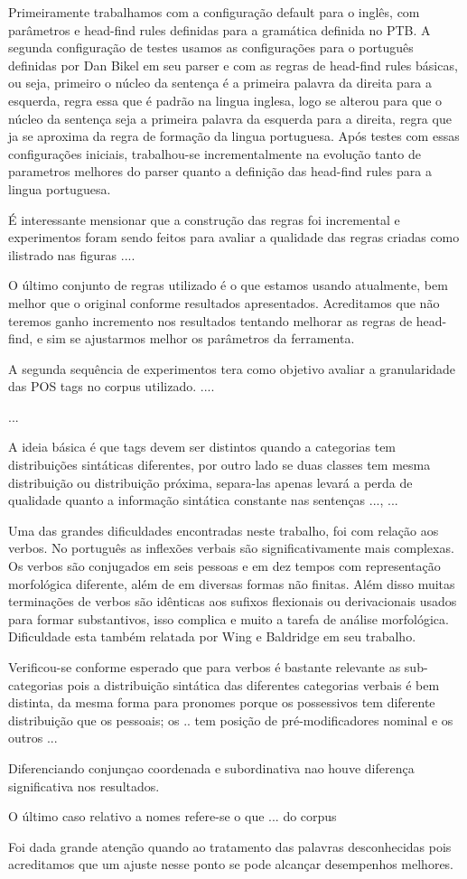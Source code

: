 Primeiramente trabalhamos com a configuração default para o inglês, com parâmetros e head-find rules definidas para a gramática definida no PTB. A segunda configuração de testes usamos as configurações para o português definidas por Dan Bikel em seu parser e com as regras de head-find rules básicas, ou seja, primeiro o núcleo da sentença é a primeira palavra da direita para a esquerda, regra essa que é padrão na lingua inglesa, logo se alterou para que o núcleo da sentença seja a primeira palavra da esquerda para a direita, regra que ja se aproxima da regra de formação da lingua portuguesa. Após testes com essas configurações iniciais, trabalhou-se incrementalmente na evolução tanto de parametros melhores do parser quanto a definição das head-find rules para a lingua portuguesa.

É interessante mensionar que a construção das regras foi incremental e experimentos foram sendo feitos para avaliar a qualidade das regras criadas como ilistrado nas figuras ....

O último conjunto de regras utilizado é o que estamos usando atualmente, bem melhor que o original conforme resultados apresentados. Acreditamos que não teremos ganho incremento nos resultados tentando melhorar as regras de head-find, e sim se ajustarmos melhor os parâmetros da ferramenta.

A segunda sequência de experimentos tera como objetivo avaliar a granularidade das POS tags no corpus utilizado. ....

...


A ideia básica é que tags devem ser distintos quando a categorias tem distribuições sintáticas diferentes, por outro lado se duas classes tem mesma distribuição ou distribuição próxima, separa-las apenas levará a perda de qualidade quanto a informação sintática constante nas sentenças ...,  ...

Uma das grandes dificuldades encontradas neste trabalho, foi com relação aos verbos. No português as inflexões verbais são significativamente mais complexas. Os verbos são conjugados em seis pessoas e em dez tempos com representação morfológica diferente, além de em diversas formas não finitas. Além disso muitas terminações de verbos são idênticas aos sufixos flexionais ou derivacionais usados para formar substantivos, isso complica e muito a tarefa de análise morfológica. Dificuldade esta também relatada por Wing e Baldridge em seu trabalho.

Verificou-se conforme esperado que para verbos é bastante relevante as sub-categorias pois a distribuição sintática das diferentes categorias verbais é bem distinta, da mesma forma para pronomes porque os possessivos tem diferente distribuição que os pessoais; os .. tem posição de pré-modificadores nominal e os outros ...

Diferenciando conjunçao coordenada e subordinativa nao houve diferença significativa nos resultados.

O último caso relativo a nomes refere-se  o que ... do corpus 

Foi dada grande atenção quando ao tratamento das palavras desconhecidas pois acreditamos que um ajuste nesse ponto se pode alcançar desempenhos melhores.

